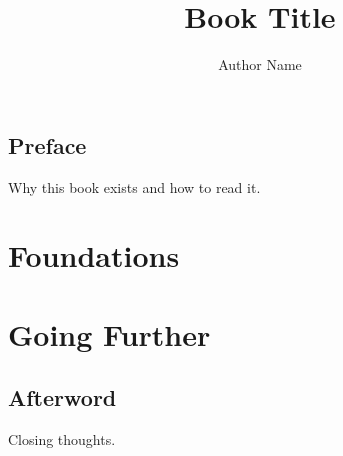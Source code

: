 \documentclass[11pt,openany]{book}
\title{Book Title}
\author{Author Name}
\date{}
\begin{document}
\frontmatter
\maketitle
\chapter{Preface}
Why this book exists and how to read it.
\tableofcontents

\mainmatter
\part{Foundations}


\part{Going Further}


\backmatter
\chapter{Afterword}
Closing thoughts.
\end{document}
